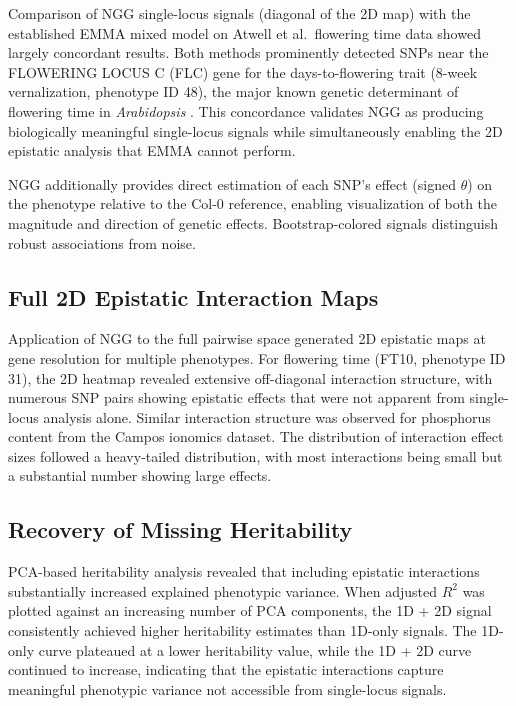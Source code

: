 \documentclass[11pt]{article}
\begin{document}
Comparison of NGG single-locus signals (diagonal of the 2D map) with the established EMMA mixed model on Atwell et al.\ flowering time data showed largely concordant results. Both methods prominently detected SNPs near the FLOWERING LOCUS C (FLC) gene for the days-to-flowering trait (8-week vernalization, phenotype ID 48), the major known genetic determinant of flowering time in \textit{Arabidopsis} \citep{michaelson2009}. This concordance validates NGG as producing biologically meaningful single-locus signals while simultaneously enabling the 2D epistatic analysis that EMMA cannot perform.

NGG additionally provides direct estimation of each SNP's effect (signed $\theta$) on the phenotype relative to the Col-0 reference, enabling visualization of both the magnitude and direction of genetic effects. Bootstrap-colored signals distinguish robust associations from noise.

\subsection{Full 2D Epistatic Interaction Maps}

Application of NGG to the full pairwise space generated 2D epistatic maps at gene resolution for multiple phenotypes. For flowering time (FT10, phenotype ID 31), the 2D heatmap revealed extensive off-diagonal interaction structure, with numerous SNP pairs showing epistatic effects that were not apparent from single-locus analysis alone. Similar interaction structure was observed for phosphorus content from the Campos ionomics dataset. The distribution of interaction effect sizes followed a heavy-tailed distribution, with most interactions being small but a substantial number showing large effects.

\subsection{Recovery of Missing Heritability}

PCA-based heritability analysis revealed that including epistatic interactions substantially increased explained phenotypic variance. When adjusted $R^2$ was plotted against an increasing number of PCA components, the 1D + 2D signal consistently achieved higher heritability estimates than 1D-only signals. The 1D-only curve plateaued at a lower heritability value, while the 1D + 2D curve continued to increase, indicating that the epistatic interactions capture meaningful phenotypic variance not accessible from single-locus signals.
\end{document}
